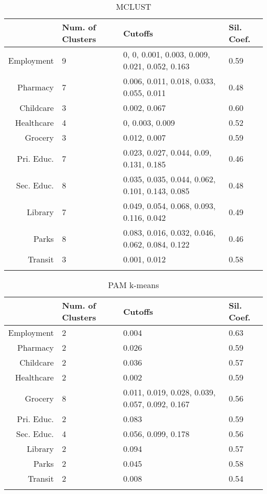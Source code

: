 \documentclass[10pt, a4paper]{article}
\begin{document}
 




\begin{longtable}{rlll}
  \hline
 & Num. of Clusters & Cutoffs & Sil. Coef. \\ 
  \hline
Employment & 9 & 0, 0, 0.001, 0.003, 0.009, 0.021, 0.052, 0.163 & 0.59 \\ 
   \hline
Pharmacy & 7 & 0.006, 0.011, 0.018, 0.033, 0.055, 0.011 & 0.48 \\ 
   \hline
Childcare & 3 & 0.002, 0.067 & 0.60 \\ 
   \hline
Healthcare & 4 & 0, 0.003, 0.009 & 0.52 \\ 
   \hline
Grocery & 3 & 0.012, 0.007 & 0.59 \\ 
   \hline
Pri. Educ. & 7 & 0.023, 0.027, 0.044, 0.09, 0.131, 0.185 & 0.46 \\ 
   \hline
Sec. Educ. & 8 & 0.035, 0.035, 0.044, 0.062, 0.101, 0.143, 0.085 & 0.48 \\ 
   \hline
Library & 7 & 0.049, 0.054, 0.068, 0.093, 0.116, 0.042 & 0.49 \\ 
   \hline
Parks & 8 & 0.083, 0.016, 0.032, 0.046, 0.062, 0.084, 0.122 & 0.46 \\ 
   \hline
Transit & 3 & 0.001, 0.012 & 0.58 \\ 
   \hline
\hline
\caption{MCLUST} 
\end{longtable}





 \pagebreak 
 
\begin{longtable}{rlll}
  \hline
 & Num. of Clusters & Cutoffs & Sil. Coef. \\ 
  \hline
Employment & 2 & 0.004 & 0.63 \\ 
   \hline
Pharmacy & 2 & 0.026 & 0.59 \\ 
   \hline
Childcare & 2 & 0.036 & 0.57 \\ 
   \hline
Healthcare & 2 & 0.002 & 0.59 \\ 
   \hline
Grocery & 8 & 0.011, 0.019, 0.028, 0.039, 0.057, 0.092, 0.167 & 0.56 \\ 
   \hline
Pri. Educ. & 2 & 0.083 & 0.59 \\ 
   \hline
Sec. Educ. & 4 & 0.056, 0.099, 0.178 & 0.56 \\ 
   \hline
Library & 2 & 0.094 & 0.57 \\ 
   \hline
Parks & 2 & 0.045 & 0.58 \\ 
   \hline
Transit & 2 & 0.008 & 0.54 \\ 
   \hline
\hline
\caption{PAM k-means} 
\end{longtable}
\end{document}
